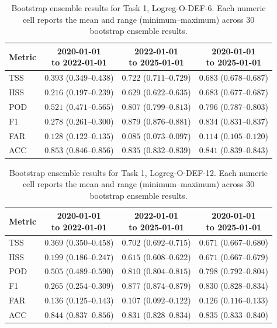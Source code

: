 \begin{table}[htbp]
\centering
\small
\caption{Bootstrap ensemble results for Task 1, Logreg-O-DEF-6. Each numeric cell reports the mean and range (minimum--maximum) across 30 bootstrap ensemble results.}
\label{tab:app-task1-logreg-o-def-6}
\begin{tabular}{lccc}
\toprule
Metric & \shortstack{2020-01-01\\to 2022-01-01} & \shortstack{2022-01-01\\to 2025-01-01} & \shortstack{2020-01-01\\to 2025-01-01} \\
\midrule
TSS & $0.393$ ($0.349$--$0.438$) & $0.722$ ($0.711$--$0.729$) & $0.683$ ($0.678$--$0.687$) \\
HSS & $0.216$ ($0.197$--$0.239$) & $0.629$ ($0.622$--$0.635$) & $0.683$ ($0.677$--$0.687$) \\
POD & $0.521$ ($0.471$--$0.565$) & $0.807$ ($0.799$--$0.813$) & $0.796$ ($0.787$--$0.803$) \\
F1 & $0.278$ ($0.261$--$0.300$) & $0.879$ ($0.876$--$0.881$) & $0.834$ ($0.831$--$0.837$) \\
FAR & $0.128$ ($0.122$--$0.135$) & $0.085$ ($0.073$--$0.097$) & $0.114$ ($0.105$--$0.120$) \\
ACC & $0.853$ ($0.846$--$0.856$) & $0.835$ ($0.832$--$0.839$) & $0.841$ ($0.839$--$0.843$) \\
\bottomrule
\end{tabular}
\end{table}
\clearpage

\begin{table}[htbp]
\centering
\small
\caption{Bootstrap ensemble results for Task 1, Logreg-O-DEF-12. Each numeric cell reports the mean and range (minimum--maximum) across 30 bootstrap ensemble results.}
\label{tab:app-task1-logreg-o-def-12}
\begin{tabular}{lccc}
\toprule
Metric & \shortstack{2020-01-01\\to 2022-01-01} & \shortstack{2022-01-01\\to 2025-01-01} & \shortstack{2020-01-01\\to 2025-01-01} \\
\midrule
TSS & $0.369$ ($0.350$--$0.458$) & $0.702$ ($0.692$--$0.715$) & $0.671$ ($0.667$--$0.680$) \\
HSS & $0.199$ ($0.186$--$0.247$) & $0.615$ ($0.608$--$0.622$) & $0.671$ ($0.667$--$0.679$) \\
POD & $0.505$ ($0.489$--$0.590$) & $0.810$ ($0.804$--$0.815$) & $0.798$ ($0.792$--$0.804$) \\
F1 & $0.265$ ($0.254$--$0.309$) & $0.877$ ($0.874$--$0.879$) & $0.830$ ($0.828$--$0.834$) \\
FAR & $0.136$ ($0.125$--$0.143$) & $0.107$ ($0.092$--$0.122$) & $0.126$ ($0.116$--$0.133$) \\
ACC & $0.844$ ($0.837$--$0.856$) & $0.831$ ($0.828$--$0.834$) & $0.835$ ($0.833$--$0.840$) \\
\bottomrule
\end{tabular}
\end{table}
\clearpage

